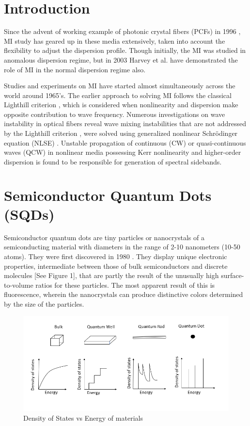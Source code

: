 \documentclass[12pt,a4paper]{article}
\begin{document}
\section{Introduction}
Since the advent of working example of photonic crystal fibers (PCFs) in 1996 \cite{photoniccrystal}, MI study has geared up in these media extensively, taken into account the flexibility to adjust the dispersion profile. Though initially, the MI was studied in anomalous dispersion regime, but in 2003 Harvey et al.\cite{harvey2003scalar} have demonstrated the role of MI in the normal dispersion regime also.\par
Studies and experiments on MI have started almost simultaneously across the world around 1965’s. The earlier approach to solving MI follows the classical Lighthill criterion \cite{lighthall}, which is considered when nonlinearity and dispersion make opposite contribution to wave frequency. Numerous investigations on wave instability in optical fibers reveal wave mixing instabilities that are not addressed by the Lighthill criterion \cite{lighthall}, were solved using generalized nonlinear Schr\"{o}dinger equation (NLSE) \cite{RBoyd}. Unstable propagation of continuous (CW) or quasi-continuous waves (QCW) in nonlinear media possessing Kerr nonlinearity and higher-order dispersion is found to be responsible for generation of spectral sidebands.

\section{Semiconductor Quantum Dots (SQDs)}
Semiconductor quantum dots are tiny particles or nanocrystals of a semiconducting material with diameters in the range of 2-10 nanometers (10-50 atoms). They were first discovered in 1980 \cite{quantumdots1980}. They display unique electronic properties, intermediate between those of bulk semiconductors and discrete molecules [See Figure 1], that are partly the result of the unusually high surface-to-volume ratios for these particles. The most apparent result of this is fluorescence, wherein the nanocrystals can produce distinctive colors determined by the size of the particles.

\begin{figure}[h]
    \centering
    \includegraphics[width=0.6\linewidth]{./pictures/DoSvsE.png}
    \caption{Density of States vs Energy of materials}
    \label{fig:DoS vs Energy of materials}
\end{figure}
\end{document}
